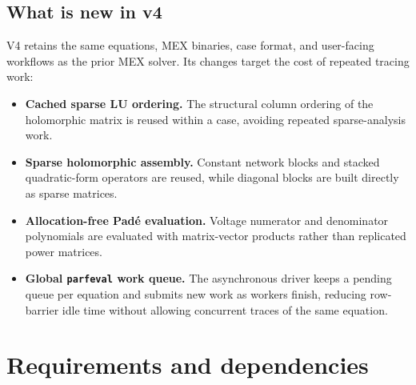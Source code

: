 \documentclass[11pt,a4paper]{article}
\newcommand{\code}[1]{\texttt{#1}}
\begin{document}
\subsection{What is new in v4}\label{sec:v4}
V4 retains the same equations, MEX binaries, case format, and user-facing workflows as
the prior MEX solver. Its changes target the cost of repeated tracing work:
\begin{itemize}[leftmargin=1.4em]
  \item \textbf{Cached sparse LU ordering.} The structural column ordering of the
        holomorphic matrix is reused within a case, avoiding repeated sparse-analysis work.
  \item \textbf{Sparse holomorphic assembly.} Constant network blocks and stacked
        quadratic-form operators are reused, while diagonal blocks are built directly as
        sparse matrices.
  \item \textbf{Allocation-free Pad\'e evaluation.} Voltage numerator and denominator
        polynomials are evaluated with matrix-vector products rather than replicated
        power matrices.
  \item \textbf{Global \code{parfeval} work queue.} The asynchronous driver keeps a
        pending queue per equation and submits new work as workers finish, reducing
        row-barrier idle time without allowing concurrent traces of the same equation.
\end{itemize}

\section{Requirements and dependencies}
\end{document}

